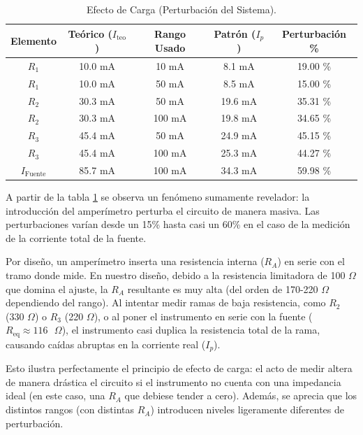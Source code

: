 \begin{table}[h!]
    \centering
    \caption{Efecto de Carga (Perturbación del Sistema).}
    \label{tab:paralelo_error_carga}
    \begin{tabular}{ccccc}
        \toprule
        \textbf{Elemento} & \textbf{Teórico ($I_{\text{teo}}$)} & \textbf{Rango Usado} & \textbf{Patrón ($I_p$)} & \textbf{Perturbación \%} \\
        \midrule
        $R_1$ & 10.0 mA & 10 mA & 8.1 mA & 19.00 \% \\
        $R_1$ & 10.0 mA & 50 mA & 8.5 mA & 15.00 \% \\
        \midrule
        $R_2$ & 30.3 mA & 50 mA & 19.6 mA & 35.31 \% \\
        $R_2$ & 30.3 mA & 100 mA & 19.8 mA & 34.65 \% \\
        \midrule
        $R_3$ & 45.4 mA & 50 mA & 24.9 mA & 45.15 \% \\
        $R_3$ & 45.4 mA & 100 mA & 25.3 mA & 44.27 \% \\
        \midrule
        $I_{\text{Fuente}}$ & 85.7 mA & 100 mA & 34.3 mA & 59.98 \% \\
        \bottomrule
    \end{tabular}
\end{table}

A partir de la tabla \ref{tab:paralelo_error_carga} se observa un fenómeno sumamente revelador: la introducción del amperímetro perturba el circuito de manera masiva. Las perturbaciones varían desde un 15\% hasta casi un 60\% en el caso de la medición de la corriente total de la fuente. 

Por diseño, un amperímetro inserta una resistencia interna ($R_A$) en serie con el tramo donde mide. En nuestro diseño, debido a la resistencia limitadora de 100 $\Omega$ que domina el ajuste, la $R_A$ resultante es muy alta (del orden de 170-220 $\Omega$ dependiendo del rango). Al intentar medir ramas de baja resistencia, como $R_2$ (330 $\Omega$) o $R_3$ (220 $\Omega$), o al poner el instrumento en serie con la fuente ($R_{\text{eq}} \approx 116\text{ }\Omega$), el instrumento casi duplica la resistencia total de la rama, causando caídas abruptas en la corriente real ($I_p$).

Esto ilustra perfectamente el principio de efecto de carga: el acto de medir altera de manera drástica el circuito si el instrumento no cuenta con una impedancia ideal (en este caso, una $R_A$ que debiese tender a cero). Además, se aprecia que los distintos rangos (con distintas $R_A$) introducen niveles ligeramente diferentes de perturbación.









